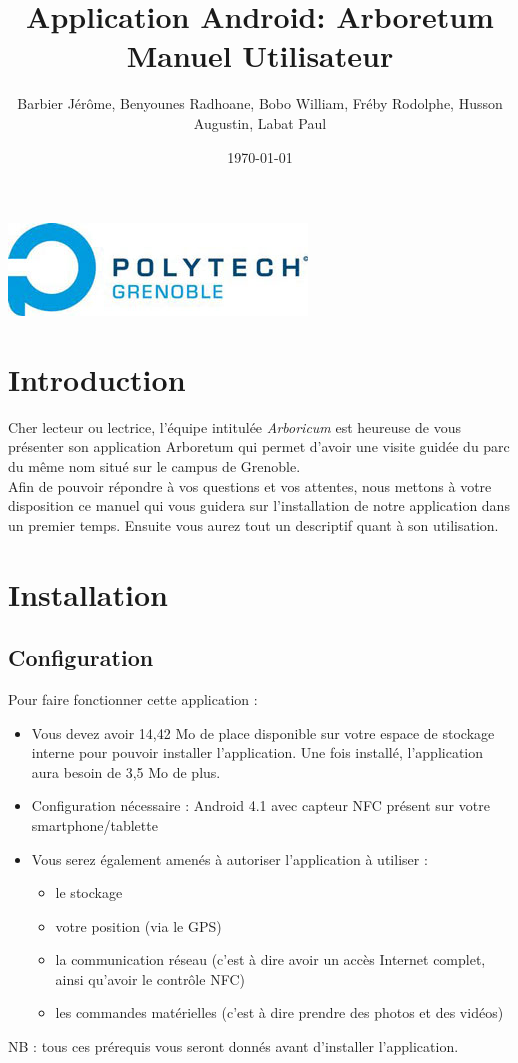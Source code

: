 \documentclass[a4paper,11pt]{article}
\title{Application Android: Arboretum\\
Manuel Utilisateur}
\author{Barbier Jérôme, Benyounes Radhoane, Bobo William, Fréby Rodolphe, Husson Augustin, Labat Paul}
\date{\today}
\begin{document}
  \maketitle

  \begin{center}
    \includegraphics{logoPol.jpg}\\
  \end{center}
  \tableofcontents
  \newpage
  
  \section{Introduction}
    Cher lecteur ou lectrice, l'équipe intitulée \textit{Arboricum} est heureuse de vous présenter son application Arboretum qui permet d'avoir une visite 
    guidée du parc du même nom situé sur le campus de Grenoble. \\
    Afin de pouvoir répondre à vos questions et vos attentes, nous mettons à votre disposition ce manuel qui vous guidera sur l'installation de
    notre application dans un premier temps. Ensuite vous aurez tout un descriptif quant à son utilisation.
  \section{Installation}
    \subsection{Configuration}
    Pour faire fonctionner cette application : 
    \begin{itemize}
     \item Vous devez avoir 14,42 Mo de place disponible sur votre espace de stockage interne pour pouvoir installer l'application. Une fois installé, l'application
     aura besoin de 3,5 Mo de plus.
     \item Configuration nécessaire : Android 4.1 avec capteur NFC présent sur votre smartphone/tablette
     \item Vous serez également amenés à autoriser l'application à utiliser : 
     \begin{itemize}
      \item le stockage
      \item votre position (via le GPS)
      \item la communication réseau (c'est à dire avoir un accès Internet complet, ainsi qu'avoir le contrôle NFC)
      \item les commandes matérielles (c'est à dire prendre des photos et des vidéos)
     \end{itemize}
    \end{itemize}
NB : tous ces prérequis vous seront donnés avant d'installer l'application.
\end{document}

